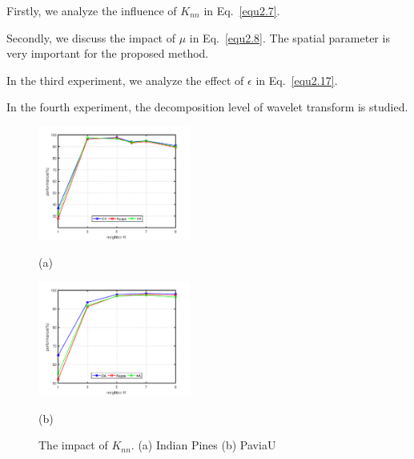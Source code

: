 \documentclass{ws-ijwmip}
\begin{document}
\begin{romanlist}[(ii)]
\item Firstly, we analyze the influence of $K_{nn}$ in Eq.~\ref{equ2.7}.
\item Secondly, we discuss the impact of  $\mu$ in Eq.~\ref{equ2.8}. The spatial parameter is very important for the proposed method.
\item In the third experiment, we analyze the effect of  $\epsilon$ in Eq.~\ref{equ2.17}.
\item  In the fourth experiment, the decomposition level of wavelet transform is studied.
\end{romanlist}
\begin{figure}[bh]
        \centering
        \begin{minipage}[b]{0.45\linewidth}
            \centering
            \centerline{
            \includegraphics[width=5cm ]{image/indianPines_K}}
            \centerline{(a)}
            \medskip
        \end{minipage}
        \begin{minipage}[b]{0.45\linewidth}
            \centering
            \centerline{
            \includegraphics[width=5cm ]{image/paviaU_K}}
            \centerline{(b)}
            \medskip
        \end{minipage}
        \caption{The impact of $K_{nn}$. (a) Indian Pines  (b) PaviaU}
        \label{figure3}
    \end{figure}
\end{document}

